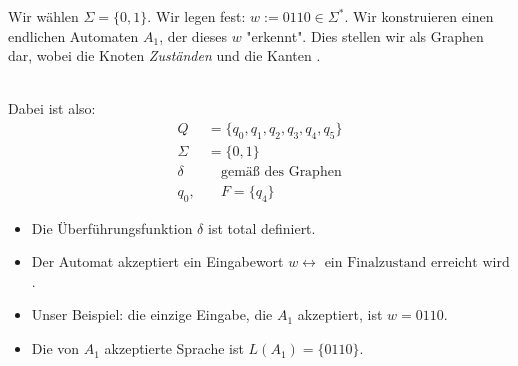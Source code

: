 \documentclass[runningheads,deutsch]{llncs}
\begin{document}
\begin{example}
    Wir wählen $\Sigma = \{0, 1\}.$ Wir legen fest: $w := 0110 \in \Sigma^*$. Wir konstruieren einen endlichen Automaten $A_1$, der dieses $w$ "erkennt". Dies stellen wir als Graphen dar, wobei die Knoten \textit{Zuständen} und die Kanten .
    \\
    \\

    Dabei ist also:
    \begin{align*}
        Q &= \{q_0, q_1, q_2, q_3, q_4, q_5\} \\
        \Sigma &= \{0, 1\} \\
        \delta &\quad \text{gemäß des Graphen} \\
        q_0, &\quad F= \{q_4\}
    \end{align*}

    \begin{itemize}
        \item Die Überführungsfunktion $\delta$ ist total definiert.
        \item Der Automat akzeptiert ein Eingabewort $w \leftrightarrow \text{ ein Finalzustand erreicht wird}$.
        \item Unser Beispiel: die einzige Eingabe, die $A_1$ akzeptiert, ist $w = 0110$.
        \item Die von $A_1$ akzeptierte Sprache ist $L(A_1) = \{0110\}$.
    \end{itemize}
\end{example}
\end{document}
